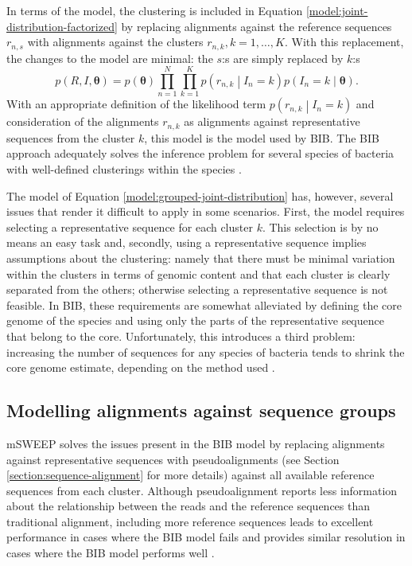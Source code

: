 \documentclass[officiallayout]{tktla}
\begin{document}
In terms of the model, the clustering is included in Equation
\eqref{model:joint-distribution-factorized} by replacing alignments
against the reference sequences $r_{n, s}$ with alignments against the
clusters $r_{n, k}, k = 1, \dots, K$. With this replacement, the
changes to the model are minimal: the $s$:s are simply replaced by
$k$:s
\begin{equation}
  \label{model:grouped-joint-distribution}
  p\left(R, I, \boldsymbol\theta\right) = p\left(\boldsymbol\theta\right)\prod_{n = 1}^{N} \prod_{k = 1}^{K} p\left(r_{n, k} \middle| I_{n} = k\right) p\left(I_{n} = k \middle| \boldsymbol\theta\right).
\end{equation}
With an appropriate definition of the likelihood term $p\left(r_{n, k}
\middle| I_{n} = k\right)$ and consideration of the alignments $r_{n,
  k}$ as alignments against representative sequences from the cluster
$k$, this model is the model used by BIB. The BIB approach adequately
solves the inference problem for several species of bacteria with
well-defined clusterings within the species
\citep{sankar2016bayesian}.

The model of Equation \eqref{model:grouped-joint-distribution} has,
however, several issues that render it difficult to apply in some
scenarios. First, the model requires selecting a representative
sequence for each cluster $k$. This selection is by no means an easy
task and, secondly, using a representative sequence implies
assumptions about the clustering: namely that there must be minimal
variation within the clusters in terms of genomic content and that
each cluster is clearly separated from the others; otherwise selecting
a representative sequence is not feasible. In BIB, these requirements
are somewhat alleviated by defining the core genome of the species and
using only the parts of the representative sequence that belong to the
core. Unfortunately, this introduces a third problem: increasing the
number of sequences for any species of bacteria tends to shrink the
core genome estimate, depending on the method used
\citep{tonkin2020producing}.

\subsection{Modelling alignments against sequence groups}

mSWEEP solves the issues present in the BIB model by replacing
alignments against representative sequences with pseudoalignments (see
Section \ref{section:sequence-alignment} for more details) against all
available reference sequences from each cluster. Although
pseudoalignment reports less information about the relationship
between the reads and the reference sequences than traditional
alignment, including more reference sequences leads to excellent
performance in cases where the BIB model fails and provides similar
resolution in cases where the BIB model performs well
\citep{maklin_high-resolution_2021}.
\end{document}

